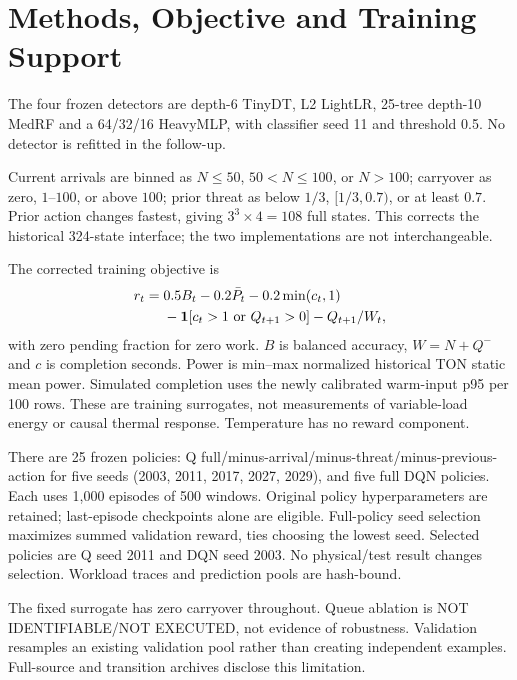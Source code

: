 \section{Methods, Objective and Training Support}\label{sec:methods}
The four frozen detectors are depth-6 TinyDT, L2 LightLR, 25-tree depth-10 MedRF and a 64/32/16 HeavyMLP, with classifier seed 11 and threshold 0.5. No detector is refitted in the follow-up.

Current arrivals are binned as $N\leq50$, $50<N\leq100$, or $N>100$; carryover as zero, $1$--$100$, or above $100$; prior threat as below $1/3$, $[1/3,0.7)$, or at least $0.7$. Prior action changes fastest, giving $3^3\times4=108$ full states. This corrects the historical 324-state interface; the two implementations are not interchangeable.

The corrected training objective is
\begin{align}
r_t={}&0.5 B_t-0.2\bar P_t-0.2\min(c_t,1)\nonumber\\
&-\mathbf{1}[c_t>1\ \mathrm{or}\ Q_{t+1}>0]-Q_{t+1}/W_t,
\end{align}
with zero pending fraction for zero work. $B$ is balanced accuracy, $W=N+Q^-$ and $c$ is completion seconds. Power is min--max normalized historical TON static mean power. Simulated completion uses the newly calibrated warm-input p95 per 100 rows. These are training surrogates, not measurements of variable-load energy or causal thermal response. Temperature has no reward component.

There are 25 frozen policies: Q full/minus-arrival/minus-threat/minus-previous-action for five seeds (2003, 2011, 2017, 2027, 2029), and five full DQN policies. Each uses 1,000 episodes of 500 windows. Original policy hyperparameters are retained; last-episode checkpoints alone are eligible. Full-policy seed selection maximizes summed validation reward, ties choosing the lowest seed. Selected policies are Q seed 2011 and DQN seed 2003. No physical/test result changes selection. Workload traces and prediction pools are hash-bound.

The fixed surrogate has zero carryover throughout. Queue ablation is NOT IDENTIFIABLE/NOT EXECUTED, not evidence of robustness. Validation resamples an existing validation pool rather than creating independent examples. Full-source and transition archives disclose this limitation.

